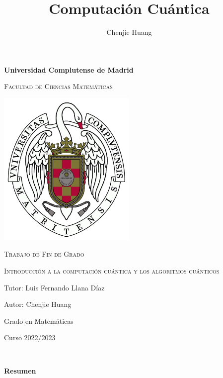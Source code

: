 \documentclass[a4paper]{article}
\title{Computación Cuántica}
\author{Chenjie Huang}
\date{}
\numberwithin{equation}{section}
\begin{document}
\begin{titlepage}
\centering
{\bfseries\LARGE Universidad Complutense de Madrid \par}
\vspace{1cm}
{\scshape\Large Facultad de Ciencias Matemáticas \par}
\vspace{0.5cm}

\includegraphics[width=0.5\textwidth]{escudo_ucm}

\vspace{0.5cm}
{\scshape\Large Trabajo de Fin de Grado \par}

\vspace{0.5cm}

{\scshape\Huge Introducción a la computación cuántica y los algoritmos cuánticos \par}
\vspace{2cm}

\vfill
{\Large Tutor: Luis Fernando Llana Díaz \par}

{\Large Autor: Chenjie Huang\par}

{\Large Grado en Matemáticas\par}

\vfill
{\Large Curso 2022/2023 \par}
\end{titlepage}

\newpage

\thispagestyle{empty}
\

\newpage
\begin{center}
\textbf{\Large Resumen}
\end{center}
\vspace{0.5cm}
\end{document}
